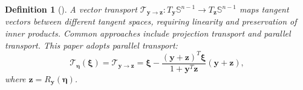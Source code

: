\documentclass[a4paper,fleqn,numbers]{cas-sc}
\newtheorem{definition}[theorem]{Definition}
\begin{document}
%		
%	
%	
	
	\begin{definition}[\cite{qi2011}]
		A vector transport $\mathcal{T}_{\mathbf{y} \to \mathbf{z}}: T_{\mathbf{y}} \mathbb{S}^{n-1} \to T_{\mathbf{z}} \mathbb{S}^{n-1}$ maps tangent vectors between different tangent spaces, requiring linearity and preservation of inner products. Common approaches include projection transport and parallel transport. This paper adopts parallel transport:
		\[
		\mathcal{T}_{\boldsymbol{\eta}}(\boldsymbol{\xi}) =\mathcal{T}_{\mathbf{y} \to \mathbf{z}}= \boldsymbol{\xi} - \frac{(\mathbf{y} + \mathbf{z})^T \boldsymbol{\xi}}{1 + \mathbf{y}^T \mathbf{z}} (\mathbf{y} + \mathbf{z}),
		\]
		where $\mathbf{z} = R_{\mathbf{y}}(\boldsymbol{\eta})$.
	\end{definition}
	
\end{document}
